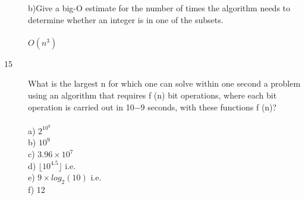 \documentclass[UTF8]{article}
\begin{document}
\begin{description}
        b)Give a big-O estimate for the number of times the algorithm needs to determine whether an integer is in one of the subsets. \\\\
        $O{(n^3)}$ \\
        \item[15]What is the largest n for which one can solve within one
second a problem using an algorithm that requires f (n)
bit operations, where each bit operation is carried out in
10−9 seconds, with these functions f (n)?  \\\\
a) $2^{10^{9}}$                                  \\
b) $10^{9}$                                      \\
c) $3.96\times 10^7$\\
d) $\lfloor 10^{4.5} \rfloor$  \quad  i.e.             \\
e) $9\times log_2(10)$  \quad  i.e.                      \\
f)  12                                           \\
        
\end{description}
\end{document}

